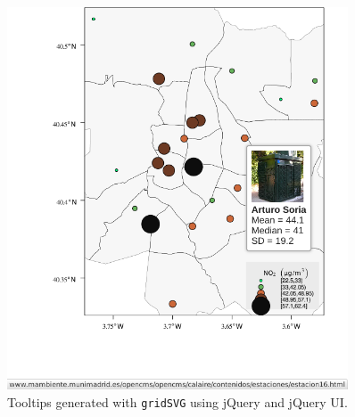 \begin{LaTeX}
\begin{figure}
\includegraphics[width=0.9\textwidth]{figs/airMadridTooltip.png}
\caption{\label{fig:airMadridTooltip}Tooltips generated with \texttt{gridSVG} using jQuery and jQuery UI.}
\end{figure}
\end{LaTeX}
